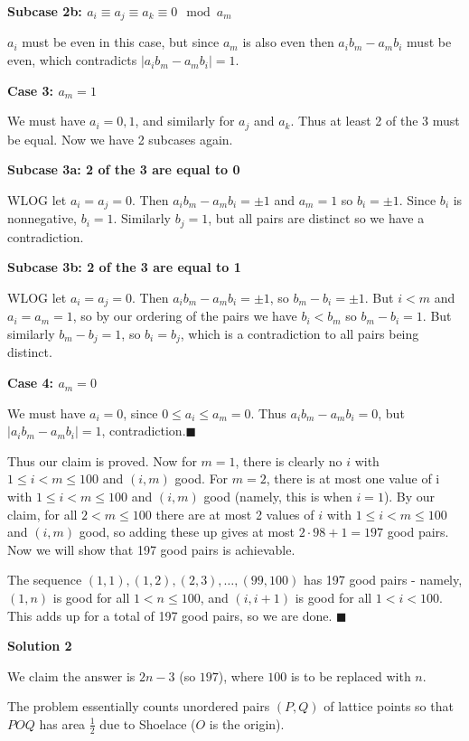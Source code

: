 \begin{enumerate}
 \textbf{Subcase 2b: $a_i\equiv a_j\equiv a_k\equiv 0 \mod a_m$}

 $a_i$ must be even in this case, but since $a_m$ is also even then $a_ib_m-a_mb_i$ must be even, which contradicts $|a_ib_m-a_mb_i|=1$.

 \textbf{Case 3: $a_m=1$}

 We must have $a_i=0,1$, and similarly for $a_j$ and $a_k$. Thus at least 2 of the 3 must be equal. Now we have 2 subcases again.

 \textbf{Subcase 3a: 2 of the 3 are equal to 0}

 WLOG let $a_i=a_j=0$. Then $a_ib_m-a_mb_i=\pm 1$ and $a_m=1$ so $b_i=\pm 1$. Since $b_i$ is nonnegative, $b_i=1$. Similarly $b_j=1$, but all pairs are distinct so we have a contradiction.

 \textbf{Subcase 3b: 2 of the 3 are equal to 1}

 WLOG let $a_i=a_j=0$. Then $a_ib_m-a_mb_i=\pm 1$, so $b_m-b_i=\pm 1$. But $i<m$ and $a_i=a_m=1$, so by our ordering of the pairs we have $b_i<b_m$ so $b_m-b_i=1$. But similarly $b_m-b_j=1$, so $b_i=b_j$, which is a contradiction to all pairs being distinct.

 \textbf{Case 4: $a_m=0$}

 We must have $a_i=0$, since $0\leq a_i\leq a_m=0$. Thus $a_ib_m-a_mb_i=0$, but $|a_ib_m-a_mb_i|=1$, contradiction.$\blacksquare$

 Thus our claim is proved. Now for $m=1$, there is clearly no $i$ with $1\leq i < m \leq 100$ and $(i, m)$ good. For $m=2$, there is at most one value of i with $1\leq i < m \leq 100$ and $(i, m)$ good (namely, this is when $i=1$). By our claim, for all $2<m\leq 100$ there are at most 2 values of $i$ with $1\leq i < m \leq 100$ and $(i, m)$ good, so adding these up gives at most $2\cdot 98+1=197$ good pairs. Now we will show that 197 good pairs is achievable. 

 The sequence $(1,1), (1,2), (2,3),\ldots ,(99,100)$ has 197 good pairs - namely, $(1, n)$ is good for all $1<n\leq 100$, and $(i, i+1)$ is good for all $1<i<100$. This adds up for a total of 197 good pairs, so we are done. $\blacksquare$




\textbf{Solution 2}

We claim the answer is $2n-3$ (so $197$), where $100$ is to be replaced with $n$.

 The problem essentially counts unordered pairs $(P,Q)$ of lattice points so that $POQ$ has area $\frac{1}{2}$ due to Shoelace ($O$ is the origin).


\end{enumerate}
